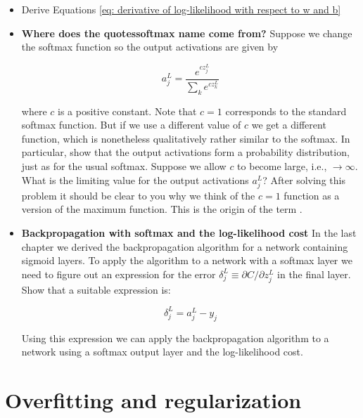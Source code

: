 \documentclass[a4paper,11pt,twoside]{report}
\begin{document}
\begin{itemize}
\item Derive Equations \ref{eq: derivative of log-likelihood with respect to w and b}
\item \textbf{Where does the quotes{softmax} name come from?}
Suppose we change the softmax function so the output activations are given by

\begin{equation}
a^L_j=\frac{e^{c z^L_j}}{\sum_k e^{c z^L_k}}
\label{eq: different form of softmax function}
\end{equation}

where $c$ is a positive constant. Note that $c=1$ corresponds to the standard softmax function. But if we use a different value of $c$ we get a different function, which is nonetheless qualitatively rather similar to the softmax. In particular, show that the output activations form a probability distribution, just as for the usual softmax. Suppose we allow $c$ to become large, i.e., $\rightarrow\infty$. What is the limiting value for the output activations $a^L_j$? After solving this problem it should be clear to you why we think of the $c=1$ function as a  version of the maximum function. This is the origin of the term .

\item \textbf{Backpropagation with softmax and the log-likelihood cost}
In the last chapter we derived the backpropagation algorithm for a network containing sigmoid layers. To apply the algorithm to a network with a softmax layer we need to figure out an expression for the error $\delta^L_j\equiv\partial C/\partial z^L_j$ in the final layer. Show that a suitable expression is:

\begin{equation}
\delta^L_j=a^L_j-y_j
\label{eq: error for softmax output layers and log-likelihood cost}
\end{equation}

Using this expression we can apply the backpropagation algorithm to a network using a softmax output layer and the log-likelihood cost.
\end{itemize}

\section{Overfitting and regularization}
\label{sec: Overfitting and regularization}
\end{document}
